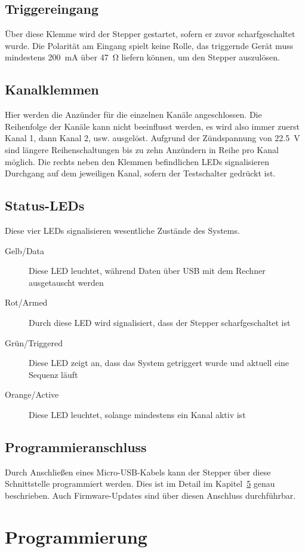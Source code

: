 \documentclass[paper=a4, open=any, numbers=noenddot]{scrbook}
\begin{document}
		\section{Triggereingang}
			Über diese Klemme wird der Stepper gestartet, sofern er zuvor scharfgeschaltet wurde. Die Polarität am Eingang spielt keine Rolle, das triggernde Gerät muss mindestens \SI{200}{\milli\ampere} über \SI{47}{\ohm} liefern können, um den Stepper auszulösen.

		\section{Kanalklemmen}
			Hier werden die Anzünder für die einzelnen Kanäle angeschlossen. Die Reihenfolge der Kanäle kann nicht beeinflusst werden, es wird also immer zuerst Kanal 1, dann Kanal 2, usw. ausgelöst. Aufgrund der Zündspannung von \SI{22,5}{\volt} sind längere Reihenschaltungen bis zu zehn Anzündern in Reihe pro Kanal möglich. Die rechts neben den Klemmen befindlichen LEDs signalisieren Durchgang auf dem jeweiligen Kanal, sofern der Testschalter gedrückt ist.

		\section{Status-LEDs}
			Diese vier LEDs signalisieren wesentliche Zustände des Systems.
			\begin{description}
				\item[Gelb/Data] Diese LED leuchtet, während Daten über USB mit dem Rechner ausgetauscht werden
				\item[Rot/Armed] Durch diese LED wird signalisiert, dass der Stepper scharfgeschaltet ist
				\item[Grün/Triggered] Diese LED zeigt an, dass das System getriggert wurde und aktuell eine Sequenz läuft
				\item[Orange/Active] Diese LED leuchtet, solange mindestens ein Kanal aktiv ist
			\end{description}

		\section{Programmieranschluss}
			Durch Anschließen eines Micro-USB-Kabels kann der Stepper über diese Schnittstelle programmiert werden. Dies ist im Detail im Kapitel~\ref{sec:gui} genau beschrieben. Auch Firmware-Updates sind über diesen Anschluss durchführbar.

	\chapter{Programmierung}
		\label{sec:gui}
\end{document}
